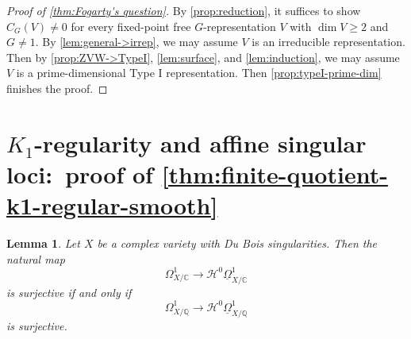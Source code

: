 \documentclass{amsart}
\newtheorem{lemma}[lemma]{Lemma}
\theoremstyle{definition}
\newcommand{\cH}{\mathcal{H}}
\begin{document}
\begin{proof}[{Proof of \autoref{thm:Fogarty's question}}]
    By \autoref{prop:reduction}, it suffices to show $C_G(V)\neq0$ for every fixed-point free $G$-representation $V$ with $\dim V\geq2$ and $G\neq1$. By \autoref{lem:general->irrep}, we may assume $V$ is an irreducible representation. Then by \autoref{prop:ZVW->TypeI}, \autoref{lem:surface}, and \autoref{lem:induction}, we may assume $V$ is a prime-dimensional Type I representation. Then \autoref{prop:typeI-prime-dim} finishes the proof.
\end{proof}












\section{$K_1$-regularity and affine singular loci:~proof of \autoref{thm:finite-quotient-k1-regular-smooth}}

\begin{lemma}\label{l:C->Q}
Let $X$ be a complex variety with Du Bois singularities. Then the
natural map
\[
\Omega^1_{X/\mathbb C}\longrightarrow
\cH^0\underline{\Omega}^1_{X/\mathbb C}
\]
is surjective if and only if
\[
\Omega^1_{X/\mathbb Q}\longrightarrow
\cH^0\underline{\Omega}^1_{X/\mathbb Q}
\]
is surjective.
\end{lemma}
\end{document}
